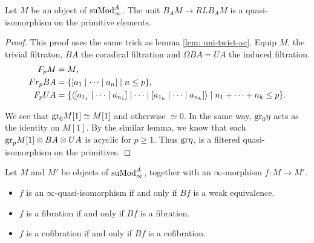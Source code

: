 \documentclass[../thesis.tex]{subfiles}
\begin{document}
            \begin{lemma}
                Let $M$ be an object of $\tt{suMod}_\infty^A$. The unit $B_AM \to RLB_AM$ is a quasi-isomorphism on the primitive elements.
            \end{lemma}

            \begin{proof}
                This proof uses the same trick as lemma \ref{lem: uni-twist-ac}. Equip $M$, the trivial filtraton, $BA$ the coradical filtration and $\Omega BA = UA$ the induced filtration.
                \begin{align*}
                    F_pM & = M\tt{,} \\
                    Fr_pBA & = \startset{[a_1 \mid \cdots \mid a_n] \mid n \leq p}\tt{,} \\
                    F_p UA & = \startset{\langle [a_{1_1} \mid \cdots \mid a_{n_1}] \mid \cdots \mid [a_{1_k} \mid \cdots \mid a_{n_k}] \rangle \mid n_1 + \cdots + n_k \leq p}\tt{.}
                \end{align*} 

                We see that $\tt{gr}_0M[1] \simeq M[1]$ and otherwise $\simeq 0$. In the same way, $\tt{gr}_0\eta$ acts as the identity on $M[1]$. By the similar lemma, we know that each $\tt{gr}_p M[1] \otimes BA \otimes UA$ is acyclic for $p \geq 1$. Thus $\tt{gr}\eta$, is a filtered quasi-isomorphism on the primitives.

            \end{proof}

            \begin{proposition}
                Let $M$ and $M'$ be objects of $\tt{suMod}_\infty^A$, together with an $\infty$-morphism $f : M \to M'$.
                \begin{itemize}
                    \item $f$ is an $\infty$-quasi-isomorphism if and only if $Bf$ is a weak equivalence.
                    \item $f$ is a fibration if and only if $Bf$ is a fibration.
                    \item $f$ is a cofibration if and only if $Bf$ is a cofibration.
                \end{itemize}
            \end{proposition}
\end{document}
